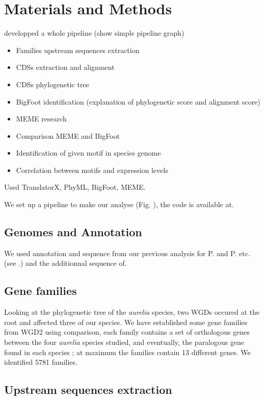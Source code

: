 \section*{Materials and Methods}

developped a whole pipeline (show simple pipeline graph)
\begin{itemize}
\item Families upstream sequences extraction
\item CDSs extraction and alignment
\item CDSs phylogenetic tree
\item BigFoot identification (explanation of phylogenetic score and alignment score)
\item MEME research
\item Comparison MEME and BigFoot
\item Identification of given motif in species genome
\item Correlation between motifs and expression levels
\end{itemize}

Used TranslatorX, PhyML, BigFoot, MEME.

We set up a pipeline to make our analyse (Fig. ), the code is available at.

\subsection*{Genomes and Annotation}

We used annotation and sequence from our previous analysis for P. and P. etc. (see .) and the additionnal sequence of.

\subsection*{Gene families}

Looking at the phylogenetic tree of the \textit{aurelia} species, two WGDs occured at the root and affected three of our species. We have established some gene families from WGD2 using comparison, each family contains a set of orthologous genes between the four \textit{aurelia} species studied, and eventually, the paralogous gene found in each species ; at maximum the families contain 13 different genes. We identified 5781 families.

\subsection*{Upstream sequences extraction}

